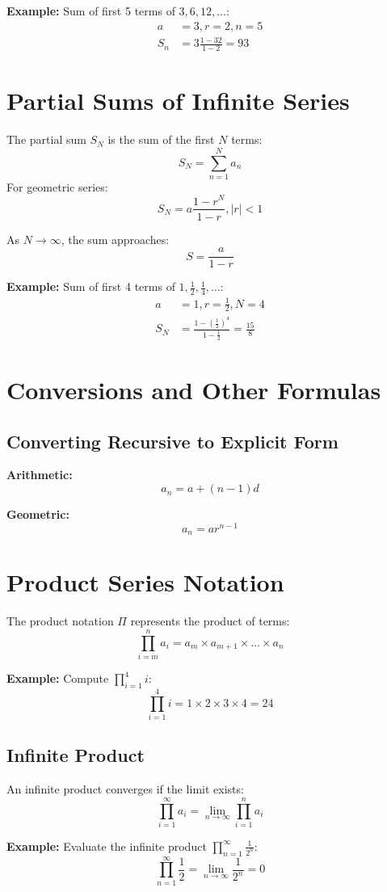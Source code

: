 \documentclass{article}
\begin{document}
\begin{multicols}{2}
\textbf{Example:} Sum of first 5 terms of \(3, 6, 12, \dots\):
\begin{align*}
    a &= 3, r = 2, n = 5 \\
    S_n &= 3\frac{1 - 32}{1 - 2} = 93
\end{align*}

\section*{Partial Sums of Infinite Series}
The partial sum \(S_N\) is the sum of the first \(N\) terms:
\[
S_N = \sum_{n=1}^{N} a_n
\]
For geometric series:
\[
S_N = a \frac{1 - r^N}{1 - r}, |r|<1
\]

As \(N \to \infty\), the sum approaches:
\[
S = \frac{a}{1-r}
\]

\textbf{Example:} Sum of first 4 terms of \(1, \frac{1}{2}, \frac{1}{4}, \dots\):
\begin{align*}
    a &= 1, r = \frac{1}{2}, N = 4 \\
    S_N &= \frac{1-(\frac{1}{2})^4}{1-\frac{1}{2}} = \frac{15}{8}
\end{align*}

\section*{Conversions and Other Formulas}

\subsection*{Converting Recursive to Explicit Form}
\textbf{Arithmetic:}
\[ a_n = a + (n-1)d \]

\textbf{Geometric:}
\[ a_n = a r^{n-1} \]

\section*{Product Series Notation}
The product notation \(\Pi\) represents the product of terms:
\[
\prod_{i=m}^{n} a_i = a_m \times a_{m+1} \times \dots \times a_n
\]

\textbf{Example:} Compute \(\prod_{i=1}^{4} i\):
\[
\prod_{i=1}^{4} i = 1 \times 2 \times 3 \times 4 = 24
\]

\subsection*{Infinite Product}
An infinite product converges if the limit exists:
\[
\prod_{i=1}^{\infty} a_i = \lim_{n\to\infty}\prod_{i=1}^{n}a_i
\]

\textbf{Example:} Evaluate the infinite product \(\prod_{n=1}^{\infty} \frac{1}{2^n}\):
\[
\prod_{n=1}^{\infty}\frac{1}{2} = \lim_{n\to\infty} \frac{1}{2^n} = 0
\]

\end{multicols}
\end{document}
